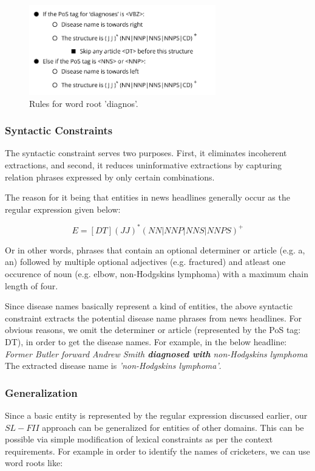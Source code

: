 \documentclass{article}
\begin{document}
\begin{figure}[h]
\centering
\includegraphics[width=3.2in]{img/rules.png}
\caption{Rules for word root 'diagnos'.}
\label{fig:rules}
\end{figure}


\subsubsection{Syntactic Constraints}

The syntactic constraint serves two purposes. First, it eliminates incoherent extractions, and second, it
reduces uninformative extractions by capturing relation phrases
expressed by only certain combinations. 

The reason for it being that entities in news headlines generally occur as the regular expression given below:

\[E = [DT](JJ)^*(NN|NNP|NNS|NNPS)^+\]

Or in other words, phrases that contain an optional determiner or article (e.g. a, an)  followed by multiple optional adjectives (e.g. fractured) and atleast one occurence of noun (e.g. elbow, non-Hodgskins lymphoma) with a maximum chain length of four. 
 
Since disease names basically represent a kind of entities, the above syntactic constraint extracts the potential disease name phrases from news headlines. For obvious reasons, we omit the determiner or article (represented by the PoS tag: DT), in order to get the disease names. For example, in the below headline: \\

\textit{Former Butler forward Andrew Smith \textbf{diagnosed with} non-Hodgskins lymphoma 
}\\

The extracted disease name is \textit{'non-Hodgskins lymphoma'}.


\subsubsection{Generalization}
Since a basic entity is represented by the regular expression discussed earlier, our $SL-FII$ approach can be generalized for entities of other domains. This can be possible via simple modification of lexical constraints as per the context requirements. For example in order to identify the names of cricketers, we can use word roots like:
\end{document}
